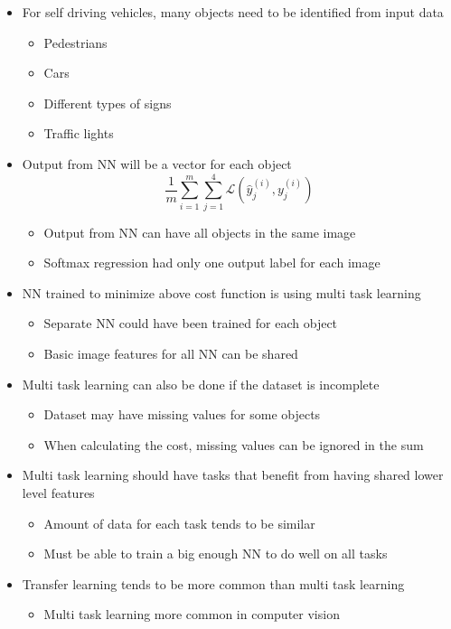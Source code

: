 \documentclass[12pt, letterpaper]{article}
\begin{document}
\begin{itemize}
\begin{itemize}
        \end{itemize}
        \item For self driving vehicles, many objects need to be identified from input data
        \begin{itemize}
            \item Pedestrians
            \item Cars 
            \item Different types of signs
            \item Traffic lights
        \end{itemize}
        \item Output from NN will be a vector for each object
        $$\frac{1}{m}\sum_{i=1}^m\sum_{j=1}^4\mathcal{L}(\hat{y}_j^{(i)}, y_j^{(i)})$$
        \begin{itemize}
            \item Output from NN can have all objects in the same image
            \item Softmax regression had only one output label for each image
        \end{itemize}
        \item NN trained to minimize above cost function is using multi task learning
        \begin{itemize}
            \item Separate NN could have been trained for each object
            \item Basic image features for all NN can be shared
        \end{itemize}
        \item Multi task learning can also be done if the dataset is incomplete
        \begin{itemize}
            \item Dataset may have missing values for some objects
            \item When calculating the cost, missing values can be ignored in the sum
        \end{itemize}
        \item Multi task learning should have tasks that benefit from having shared lower level features
        \begin{itemize}
            \item Amount of data for each task tends to be similar
            \item Must be able to train a big enough NN to do well on all tasks
        \end{itemize}
        \item Transfer learning tends to be more common than multi task learning
        \begin{itemize}
            \item Multi task learning more common in computer vision
        \end{itemize}
    \end{itemize}
\end{document}

